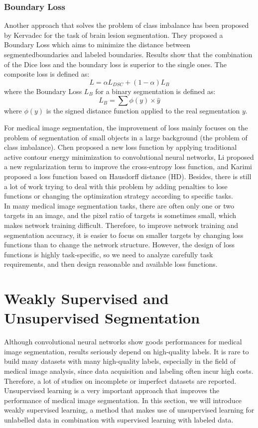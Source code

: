 \subsubsection{Boundary Loss}
Another approach that solves the problem of class imbalance has been proposed by
Kervadec \etal \cite{kervadec2019boundary} for the task of brain lesion
segmentation. They proposed a Boundary Loss which aims to minimize the distance
between segmentedboundaries and labeled boundaries. Results show that the
combination of the Dice loss and the boundary loss is superior to the single
ones. The composite loss is defined as:
$$
L = \alpha L_{DSC} + (1 - \alpha) L_{B}
$$
where the Boundary Loss $L_{B}$ for a binary segmentation is defined as:
$$
L_{B} = \sum \phi(y) \times \hat{y}
$$
where $\phi(y)$ is the signed distance function applied to the real segmentation $y$.

\par
For medical image segmentation, the improvement of loss mainly focuses on the
problem of segmentation of small objects in a large background (the problem of
class imbalance). Chen \etal \cite{kervadec2019boundary} proposed a new loss
function by applying traditional active contour energy minimization to
convolutional neural networks, Li \etal \cite{li2020transformation} proposed a
new regularization term to improve the cross-entropy loss function, and Karimi
\etal \cite{karimi2019reducing} proposed a loss function based on Hausdorff
distance (HD). Besides, there is still a lot of work trying to deal with this
problem by adding penalties to lose functions or changing the optimization
strategy according to specific tasks.\\
In many medical image segmentation tasks, there are often only one or two
targets in an image, and the pixel ratio of targets is sometimes small, which
makes network training difficult. Therefore, to improve network training and
segmentation accuracy, it is easier to focus on smaller targets by changing loss
functions than to change the network structure. However, the design of loss
functions is highly task-specific, so we need to analyze carefully task
requirements, and then design reasonable and available loss functions.

\section{Weakly Supervised and Unsupervised Segmentation}
Although convolutional neural networks show goods performances for medical image
segmentation, results seriously depend on high-quality labels. It is rare to
build many datasets with many high-quality labels, especially in the field of
medical image analysis, since data acquisition and labeling often incur high
costs. Therefore, a lot of studies on incomplete or imperfect datasets are
reported. Unsupervised learning is a very important approach that improves the
performance of medical image segmentation. In this section, we will introduce
weakly supervised learning, a method that makes use of unsupervised learning for
unlabelled data in combination with supervised learning with labeled data.

